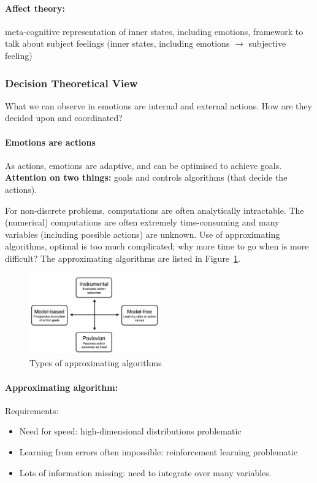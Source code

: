\documentclass[12pt,article,oneside,a4paper]{memoir}
\begin{document}
\paragraph{Affect theory:} meta-cognitive representation of inner states, including
emotions, framework to talk about subject feelings (inner states, including emotions
$\rightarrow$ subjective feeling)

\subsubsection{Decision Theoretical View}
What we can observe in emotions are internal and external actions. How are they decided upon and coordinated?

\paragraph{Emotions are actions}
As actions, emotions are adaptive, and can be optimised to achieve goals.
\textbf{Attention on two things:} goals and controls algorithms 
(that decide the actions).

For non-discrete problems, computations are often analytically intractable. The
(numerical) computations are often extremely time-consuming and many variables
(including possible actions) are unknown. Use of approximating algorithms, 
optimal is too much complicated; why more time to go when is more difficult? The
approximating algorithms are listed in Figure~\ref{fig:approximating-algorithms}.

\begin{figure}
  \centering
  \includegraphics[width=0.5\textwidth]{imgs/approximating-algorithms.png}
  \caption{Types of approximating algorithms}
  \label{fig:approximating-algorithms}
\end{figure}

\paragraph{Approximating algorithm:} 
Requirements: 
\begin{itemize}
\item Need for speed: high-dimensional distributions problematic
\item Learning from errors often impossible: reinforcement learning problematic
\item Lots of information missing: need to integrate over many variables.
\end{itemize}
\end{document}
